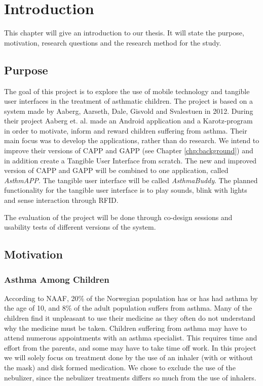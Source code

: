 \chapter{Introduction}
\label{chp:introduction}

This chapter will give an introduction to our thesis. It will state the purpose, motivation, research questions and the research method for the study. 

\section{Purpose}
\label{sec:purpose}
The goal of this project is to explore the use of mobile technology and tangible user interfaces in the treatment of asthmatic children. The project is based on a system made by Aaberg, Aarseth, Dale, Gisvold and Svalestuen in 2012\cite{CustomerDriven}. During their project Aaberg et. al. made an Android application and a Karotz-program in order to motivate, inform and reward children suffering from asthma. Their main focus was to develop the applications, rather than do research.
We intend to improve their versions of CAPP and GAPP (see Chapter \ref{chp:background}) and in addition create a Tangible User Interface from scratch. The new and improved version of CAPP and GAPP will be combined to one application, called \emph{AsthmAPP}. The tangible user interface will be called \emph{AsthmaBuddy}. The planned functionality for the tangible user interface is to play sounds, blink with lights and sense interaction through RFID. 

The evaluation of the project will be done through co-design sessions and usability tests of different versions of the system. 
 

\section{Motivation}
\label{sec:motivation}
\subsection{Asthma Among Children}
According to NAAF, 20\% of the Norwegian population has or has had asthma by the age of 10, and 8\% of the adult population suffers from asthma\cite{NAAF}. Many of the children find it unpleasant to use their medicine as they often do not understand why the medicine must be taken. Children suffering from asthma may have to attend numerous appointments with an asthma specialist. This requires time and effort from the parents, and some may have to take time off work. In this project we will solely focus on treatment done by the use of an inhaler (with or without the mask) and disk formed medication. We chose to exclude the use of the nebulizer, since the nebulizer treatments differs so much from the use of inhalers.

